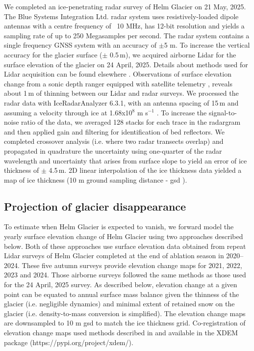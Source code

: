 \documentclass[annals,review,oneside]{igs}
\begin{document}
We completed an ice-penetrating radar survey of Helm Glacier on 21 May, 2025. The Blue Systems Integration Ltd. radar system uses resistively-loaded dipole antennas with a centre frequency of ~10 MHz, has 12-bit resolution and yields a sampling rate of up to 250 Megasamples per second. The radar system contains a single frequency GNSS system with an accuracy of $\pm$5 m. To increase the vertical accuracy for the glacier surface ($\pm$ 0.5\,m), we acquired airborne Lidar for the surface elevation of the glacier on 24 April, 2025. Details about methods used for Lidar acquisition can be found elsewhere \citep{Menounos2025}.  Observations of surface elevation change from a sonic depth ranger equipped with satellite telemetry \cite{Bevington2025a}, reveals about 1\,m of thinning between our Lidar and radar surveys. We processed the radar data with IceRadarAnalyzer 6.3.1, with an antenna spacing of 15\,m and assuming a velocity through ice at 1.68x10$^{8}$ m s$^{-1}$ \citep{Reynolds2011}. To increase the signal-to-noise ratio of the data, we averaged 128 stacks for each trace in the radargram and then applied gain and filtering for identification of bed reflectors. We completed crossover analysis (i.e. where two radar transects overlap) and propagated in quadrature  the uncertainty using one-quarter of the radar wavelength \cite{Reynolds2011} and uncertainty that arises from surface slope to yield an error of ice thickness of $\pm$ 4.5\,m.  2D linear interpolation of the ice thickness data yielded a map of ice thickness (10 m ground sampling distance - gsd ).  

\subsection{Projection of glacier disappearance}

To estimate when Helm Glacier is expected to vanish, we forward model the yearly surface elevation change of Helm Glacier using two approaches described below. Both of these approaches use surface elevation data obtained from repeat Lidar surveys of Helm Glacier completed at the end of ablation season in 2020--2024. These five autumn surveys provide elevation change maps for 2021, 2022, 2023 and 2024.  Those airborne surveys followed the same methods as those used for the 24 April, 2025 survey. As described below, elevation change at a given point can be equated to annual surface mass balance given the thinness of the glacier (i.e. negligible dynamics) and minimal extent of retained snow on the glacier (i.e. density-to-mass conversion is simplified). The elevation change maps are downsampled to 10 m gsd to match the ice thickness grid. Co-registration of elevation change maps used methods described in \cite{Nuth2011} and \cite{Hugonnet2022} available in the XDEM package (https://pypi.org/project/xdem/).
\end{document}
